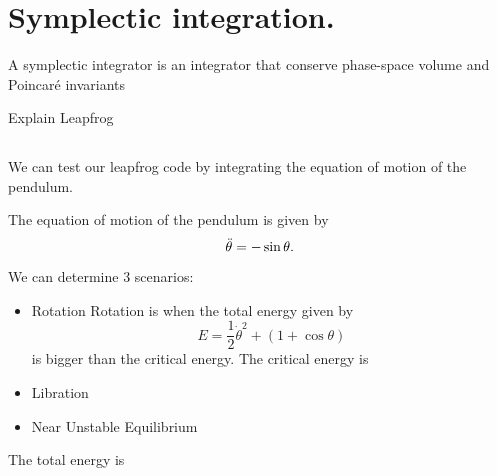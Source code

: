 \section{Symplectic integration.}

A symplectic integrator is an integrator that conserve phase-space volume and Poincar\' e invariants \cite{BinneyT_}

Explain Leapfrog 





\subsection{}
We can test our leapfrog code by integrating the equation of motion of the pendulum. 

The equation of motion of the pendulum is given by
\begin{equation}
    \Ddot{\theta}=-\sin\theta.
\end{equation}

We can determine 3 scenarios:
\begin{itemize}
    \item Rotation
    Rotation is when the total energy given by
    \begin{equation}
    E=\frac{1}{2}\Dot{\theta}^2+\left(1+\cos\theta\right)
    \end{equation}
    is bigger than the critical energy. The critical energy is 
    
    \item Libration
    \item Near Unstable Equilibrium
\end{itemize}

The total energy is




